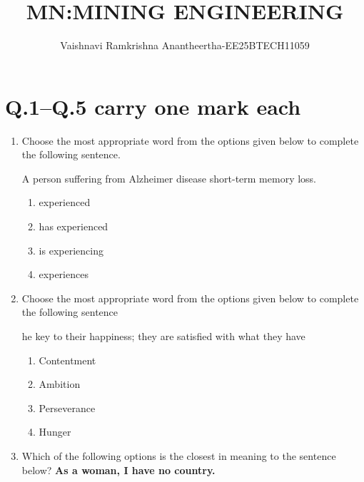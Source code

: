 \documentclass[journal,12pt,onecolumn]{IEEEtran}
\title{\Huge MN:MINING ENGINEERING}
\author{Vaishnavi Ramkrishna Anantheertha-EE25BTECH11059}
\theoremstyle{remark}
\begin{document}
\maketitle

\section*{Q.1--Q.5 carry one mark each}
\begin{enumerate}
\item Choose the most appropriate word from the options given below to complete the following sentence.
\vspace{0.5em}

A person suffering from Alzheimer disease \underline{\hspace{3cm}} short-term memory loss.

\vspace{0.5em}
\hfill{}
\begin{multicols}{4}
\begin{enumerate}
\item experienced
\item has experienced
\item is experiencing
\item experiences
\end{enumerate}
\end{multicols}
\item Choose the most appropriate word from the options given below to complete the following
sentence
\vspace{0.5em}

\underline{\hspace{3cm}} he key to their happiness; they are satisfied with what they have 

\vspace{0.5em}
\hfill{}
\begin{multicols}{4}
\begin{enumerate}
\item Contentment 
\item Ambition 
\item Perseverance 
\item Hunger
\end{enumerate}
\end{multicols}
\item Which of the following options is the closest in meaning to the sentence below?
\vspace{0.5em}
\textbf{As a woman, I have no country.}


\end{enumerate}
\end{document}
